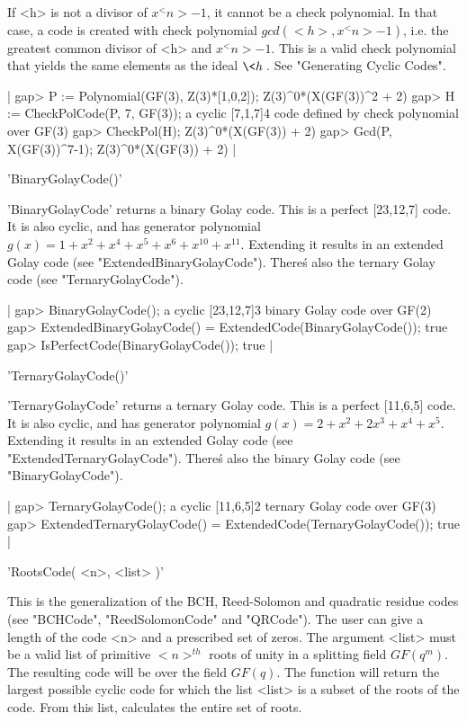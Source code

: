 If <h> is not a divisor of $x^<n>-1$, it cannot be a check polynomial. In
that case, a code is created with check polynomial $gcd( <h>, x^<n>-1 )$,
i.e. the greatest common divisor  of <h> and  $x^<n>-1$. This is a  valid
check polynomial that yields the same  elements as the ideal $\<h\>$. See
"Generating Cyclic Codes".

|    gap> P := Polynomial(GF(3), Z(3)*[1,0,2]);
    Z(3)^0*(X(GF(3))^2 + 2)
    gap> H := CheckPolCode(P, 7, GF(3));
    a cyclic [7,1,7]4 code defined by check polynomial over GF(3)
    gap> CheckPol(H);
    Z(3)^0*(X(GF(3)) + 2)
    gap> Gcd(P, X(GF(3))^7-1);
    Z(3)^0*(X(GF(3)) + 2) |


'BinaryGolayCode()'

'BinaryGolayCode'  returns   a binary  Golay   code. This  is   a perfect
[23,12,7]  code. It  is  also    cyclic,  and has  generator   polynomial
$g(x)=1+x^2+x^4+x^5+x^6+x^{10}+x^{11}$.  Extending  it    results   in an
extended  Golay code (see   "ExtendedBinaryGolayCode"). There\'s also the
ternary Golay code (see "TernaryGolayCode").

|    gap> BinaryGolayCode();
    a cyclic [23,12,7]3 binary Golay code over GF(2)
    gap> ExtendedBinaryGolayCode() = ExtendedCode(BinaryGolayCode());
    true
    gap> IsPerfectCode(BinaryGolayCode());
    true |


'TernaryGolayCode()'

'TernaryGolayCode'  returns  a ternary Golay  code.  This  is  a  perfect
[11,6,5] code.  It   is   also cyclic,   and  has  generator   polynomial
$g(x)=2+x^2+2x^3+x^4+x^5$. Extending it results in an extended Golay code
(see "ExtendedTernaryGolayCode").  There\'s also  the  binary Golay  code
(see "BinaryGolayCode").

|    gap> TernaryGolayCode();
    a cyclic [11,6,5]2 ternary Golay code over GF(3)
    gap> ExtendedTernaryGolayCode() = ExtendedCode(TernaryGolayCode());
    true |


'RootsCode( <n>, <list> )'

This is the generalization of the BCH, Reed-Solomon and quadratic residue
codes (see "BCHCode", "ReedSolomonCode" and  "QRCode"). The user can give
a length of  the code <n>  and a  prescribed  set of zeros. The  argument
<list> must be a valid  list of primitive $<n>^{th}$  roots of unity in a
splitting field $GF(q^m)$.  The resulting  code  will be over  the  field
$GF(q)$. The function  will return the  largest possible cyclic  code for
which  the list <list> is  a subset of the  roots  of the code. From this
list, {\GUAVA} calculates the entire set of roots.

